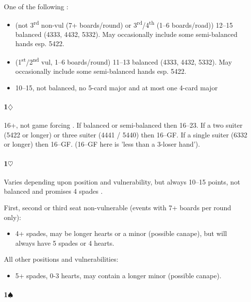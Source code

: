 \documentclass[a4paper,14pt]{extarticle}
\begin{document}
One of the following :

\begin{itemize}
\item (not 3\textsuperscript{rd} non-vul (7+ boards/round) or 3\textsuperscript{rd}/4\textsuperscript{th} (1--6 boards/road)) 12--15 balanced (4333, 4432, 5332). May occasionally include some semi-balanced hands esp. 5422.
\item (1\textsuperscript{st}/2\textsuperscript{nd} vul, 1--6 boards/round) 11--13 balanced (4333, 4432, 5332). May occasionally include some semi-balanced hands esp. 5422.

\item 10--15, not balanced, no 5-card major and at most one 4-card major
\end{itemize}

\paragraph{1$\diamondsuit$}

16+, not game forcing . If balanced or semi-balanced then 16--23. If a two suiter (5422 or longer) or three suiter (4441 / 5440) then 16--GF. If a single suiter (6332 or longer) then 16--GF. (16--GF here is 'less than a 3-loser hand').

\paragraph{1$\heartsuit$}

Varies depending upon position and vulnerability, but always 10--15 points, not
balanced and promises 4 spades .

First, second or third seat non-vulnerable (events with 7+ boards per round only):
\begin{itemize}
\item 4+ spades, may be longer hearts or a minor (possible canape), but will always have 5 spades or 4 hearts.
\end{itemize}

All other positions and vulnerabilities:
\begin{itemize}
\item 5+ spades, 0-3 hearts, may contain a longer minor (possible canape).
\end{itemize}

\newpage

\paragraph{1$\spadesuit$}
\end{document}
